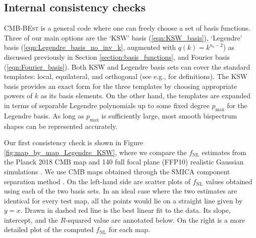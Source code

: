 \subsection{Internal consistency checks} \label{section:internal_consistency}

\textsc{CMB-BEst} is a general code where one can freely choose a set of basis functions. Three of our main options are the `KSW' basis (\ref{eqn:KSW_basis}), `Legendre' basis (\ref{eqn:Legendre_basis_no_inv_k}, augmented with $q(k)=k^{n_\text{s}-2}$) as discussed previously in Section \ref{section:basis_functions}, and Fourier basis (\ref{eqn:Fourier_basis}). Both KSW and Legendre basis sets can cover the standard templates: local, equilateral, and orthogonal (see e.g., \cite{PlanckCollaboration2013} for definitions). The KSW basis provides an exact form for the three templates by choosing appropriate powers of $k$ as its basis elements. On the other hand, the templates are expanded in terms of separable Legendre polynomials up to some fixed degree $p_\text{max}$ for the Legendre basis. As long as $p_\text{max}$ is sufficiently large, most smooth bispectrum shapes can be represented accurately. 

Our first consistency check is shown in Figure \ref{fig:map_by_map_Legendre_KSW}, where we compare the $f_\text{NL}$ estimates from the Planck 2018 CMB map and 140 full focal plane (FFP10) realistic Gaussian simulations \cite{PlanckCollaboration2015simulations}. We use CMB maps obtained through the SMICA component separation method \cite{Cardoso2008component, PlanckCollaboration2013ComponentSeparation}. On the left-hand side are scatter plots of $f_\text{NL}$ values obtained using each of the two basis sets. In an ideal case where the two estimates are identical for every test map, all the points would lie on a straight line given by $y=x$. Drawn in dashed red line is the best linear fit to the data. Its slope, intercept, and the $R$-squared value are annotated below. On the right is a more detailed plot of the computed $f_\text{NL}$ for each map.

